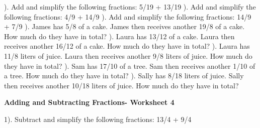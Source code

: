 \documentclass{article}%
\begin{document}
\newline%
\newline%
). Add and simplify the following fractions: 5/19 + 13/19%
\newline%
\newline%
). Add and simplify the following fractions: 4/9 + 14/9%
\newline%
\newline%
). Add and simplify the following fractions: 14/9 + 7/9%
\newline%
\newline%
). James has 5/8 of a cake. James then receives another 19/8 of a cake. How much do they have in total?%
\newline%
\newline%
). Laura has 13/12 of a cake. Laura then receives another 16/12 of a cake. How much do they have in total?%
\newline%
\newline%
). Laura has 11/8 liters of juice. Laura then receives another 9/8 liters of juice. How much do they have in total?%
\newline%
\newline%
). Sam has 17/10 of a tree. Sam then receives another 1/10 of a tree. How much do they have in total?%
\newline%
\newline%
). Sally has 8/18 liters of juice. Sally then receives another 10/18 liters of juice. How much do they have in total?%
\newline%
\newline%
\newline%
\pagebreak%
\large%
\begin{center}%
\textbf{Adding and Subtracting Fractions- Worksheet 4}%
\newline%
\newline%
\newline%
\end{center} \normalsize%
1). Subtract and simplify the following fractions: 13/4 + 9/4%
\newline%
\newline%
\end{document}
